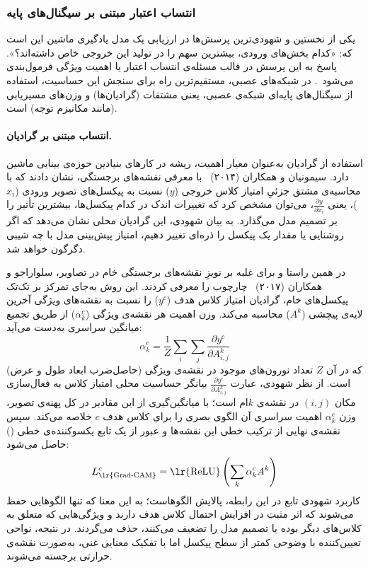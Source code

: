 \subsubsection{انتساب اعتبار مبتنی بر سیگنال‌های پایه}\label{sec:3-1-2-1}

یکی از نخستین و شهودی‌ترین پرسش‌ها در ارزیابی یک مدل یادگیری ماشین این است که: «کدام بخش‌های ورودی، بیشترین سهم را در تولید این خروجی خاص داشته‌اند؟». پاسخ به این پرسش در قالب مسئله‌ی انتساب اعتبار یا اهمیت ویژگی فرمول‌بندی می‌شود~\cite{danilevsky2020survey}. در شبکه‌های عصبی، مستقیم‌ترین راه برای سنجش این حساسیت، استفاده از سیگنال‌های پایه‌ای شبکه‌ی عصبی، یعنی مشتقات (گرادیان‌ها) و وزن‌های مسیریابی (مانند مکانیزم توجه) است.

\paragraph{انتساب مبتنی بر گرادیان.}

استفاده از گرادیان به‌عنوان معیار اهمیت، ریشه در کارهای بنیادین حوزه‌ی بینایی ماشین دارد. سیمونیان و همکاران (۲۰۱۴)~\cite{simonyan2014deepinside} با معرفی نقشه‌های برجستگی، نشان دادند که با محاسبه‌ی مشتق جزئیِ امتیاز کلاس خروجی ($y$) نسبت به پیکسل‌های تصویر ورودی ($x_i$)، یعنی $\frac{\partial y}{\partial x_i}$، می‌توان مشخص کرد که تغییرات اندک در کدام پیکسل‌ها، بیشترین تأثیر را بر تصمیم مدل می‌گذارد. به بیان شهودی، این گرادیان محلی نشان می‌دهد که اگر روشنایی یا مقدار یک پیکسل را ذره‌ای تغییر دهیم، امتیاز پیش‌بینی مدل با چه شیبی دگرگون خواهد شد.

در همین راستا و برای غلبه بر نویزِ نقشه‌های برجستگی خام در تصاویر، سلواراجو و همکاران (۲۰۱۷)~\cite{selvaraju2017gradcam} چارچوب  را معرفی کردند. این روش به‌جای تمرکز بر تک‌تک پیکسل‌های خام، گرادیان امتیاز کلاس هدف ($y^c$) را نسبت به نقشه‌های ویژگی آخرین لایه‌ی پیچشی ($A^k$) محاسبه می‌کند. وزن اهمیت هر نقشه‌ی ویژگی ($\alpha_k^c$) از طریق تجمیع میانگین سراسری به‌دست می‌آید:
\begin{equation}\label{eq:chap3_grad_cam}
    \alpha_k^c = \frac{1}{Z}\sum_i\sum_j \frac{\partial y^c}{\partial A_{i,j}^k}
\end{equation}
که در آن $Z$ تعداد نورون‌های موجود در نقشه‌ی ویژگی (حاصل‌ضرب ابعاد طول و عرض) است. از نظر شهودی، عبارت $\frac{\partial y^c}{\partial A_{i,j}^k}$ بیانگر حساسیت محلی امتیاز کلاس به فعال‌سازی مکان $(i, j)$ در نقشه‌ی $k$ام است؛ با میانگین‌گیری از این مقادیر در کل پهنه‌ی تصویر، وزن $\alpha_k^c$ اهمیت سراسری آن الگوی بصری را برای کلاس هدف $c$ خلاصه می‌کند. سپس نقشه‌ی نهایی  از ترکیب خطی این نقشه‌ها و عبور از یک تابع یکسوکننده‌ی خطی () حاصل می‌شود:
\begin{equation}\label{eq:chap3_grad_cam_map}
    L_{\text{\lr{Grad-CAM}}}^c = \text{\lr{ReLU}}\left( \sum_k \alpha_k^c A^k \right)
\end{equation}
کاربرد شهودی تابع  در این رابطه، پالایش الگوهاست؛ به این معنا که تنها الگوهایی حفظ می‌شوند که اثر مثبت در افزایش احتمال کلاس هدف دارند و ویژگی‌هایی که متعلق به کلاس‌های دیگر بوده یا تصمیم مدل را تضعیف می‌کنند، حذف می‌گردند. در نتیجه، نواحی تعیین‌کننده با وضوحی کمتر از سطح پیکسل اما با تفکیک معنایی غنی، به‌صورت نقشه‌ی حرارتی برجسته می‌شوند.

